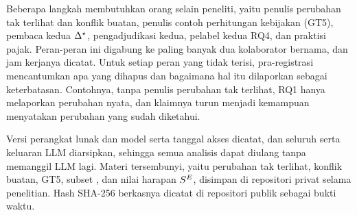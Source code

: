 Beberapa langkah membutuhkan orang selain peneliti, yaitu penulis perubahan tak terlihat dan konflik buatan, penulis contoh perhitungan kebijakan (GT5), pembaca kedua $\Delta^{\star}$, pengadjudikasi kedua, pelabel kedua RQ4, dan praktisi pajak. Peran-peran ini digabung ke paling banyak dua kolaborator bernama, dan jam kerjanya dicatat. Untuk setiap peran yang tidak terisi, pra-registrasi mencantumkan apa yang dihapus dan bagaimana hal itu dilaporkan sebagai keterbatasan. Contohnya, tanpa penulis perubahan tak terlihat, RQ1 hanya melaporkan perubahan nyata, dan klaimnya turun menjadi kemampuan menyatakan perubahan yang sudah diketahui.

Versi perangkat lunak dan model serta tanggal akses dicatat, dan seluruh  serta keluaran LLM diarsipkan, sehingga semua analisis dapat diulang tanpa memanggil LLM lagi. Materi tersembunyi, yaitu perubahan tak terlihat, konflik buatan, GT5, subset , dan nilai harapan $S^{E}$, disimpan di repositori privat selama penelitian. Hash SHA-256 berkasnya dicatat di repositori publik sebagai bukti waktu.

